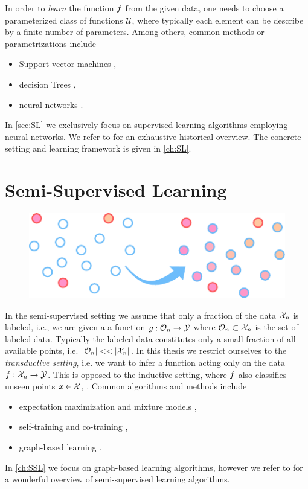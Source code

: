 In order to \emph{learn} the function $f$ from the given data, one needs to choose a parameterized class of functions $\mathcal{U}$, where typically each element can be describe by a finite number of parameters. Among others, common methods or parametrizations include
%
\begin{itemize}
\item Support vector machines \cite{cortes1995support, scholkopf2005support},
\item decision Trees \cite{morgan1963problems, Brei},
\item neural networks \cite{Turing,rosenblatt1958perceptron, minsky1969introduction}.
\end{itemize}
%
In \cref{sec:SL} we exclusively focus on supervised learning algorithms employing neural networks. We refer to \cite{SCHMIDHUBER201585} for an exhaustive historical overview. The concrete setting and learning framework is given in \cref{ch:SL}.
%
%
%
\section{Semi-Supervised Learning}\label{sec:PSSL}
\begin{figure}
\centering
\includegraphics[width=.5\textwidth]{atelier/paradigms/SSL.pdf}
\end{figure}
%
In the semi-supervised setting we assume that only a fraction of the data $\mathcal{X}_n$ is labeled, i.e., we are given a a function $g:\mathcal{O}_n\to\mathcal{\mathcal{Y}}$ where $\mathcal{O}_n\subset\mathcal{X}_n$ is the set of labeled data. Typically the labeled data constitutes only a small fraction of all available points, i.e. $\left|\mathcal{O}_n\right|<<\left|\mathcal{X}_n\right|$. In this thesis we restrict ourselves to the \emph{transductive setting}, i.e. we want to infer a function acting only on the data $f: \mathcal{X}_n\to \mathcal{\mathcal{Y}}$. This is opposed to the inductive setting, where $f$ also classifies unseen points $x\in\mathcal{X}$, \cite{zhu2005semi}. Common algorithms and methods include
%
\begin{itemize}
\item expectation maximization and mixture models \cite{dempster1977maximum,cozman2003semi},
\item self-training and co-training \cite{blum1998combining},
\item graph-based learning \cite{zhu2005semi}.
\end{itemize}
%
%
In \cref{ch:SSL} we focus on graph-based learning algorithms, however we refer to \cite{zhu2005semi} for a wonderful overview of semi-supervised learning algorithms.